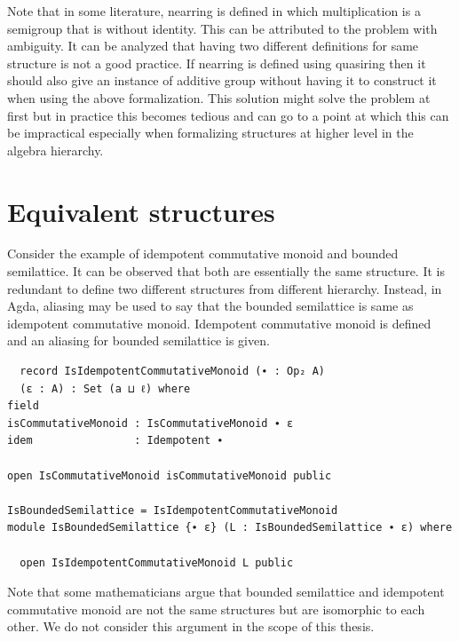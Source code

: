 Note that in some literature, nearring is defined in which multiplication is a
semigroup that is without identity. This can be attributed to the problem with
ambiguity. It can be analyzed that having two different definitions for same
structure is not a good practice. If nearring is defined using quasiring then
it should also give an instance of additive group without having it to construct
it when using the above formalization. This solution might solve the problem at
first but in practice this becomes tedious and can go to a point at which this
can be impractical especially when formalizing structures at higher level in the
algebra hierarchy.

\section{Equivalent structures}
Consider the example of idempotent commutative monoid and bounded semilattice.
It can be observed that both are essentially the same structure. It is redundant
to define two different structures from different hierarchy. Instead, in Agda,
aliasing may be used to say that the bounded semilattice is same as idempotent
commutative monoid. Idempotent commutative monoid is defined and an aliasing for
bounded semilattice is given.
\begin{verbatim}
  record IsIdempotentCommutativeMonoid (∙ : Op₂ A)
  (ε : A) : Set (a ⊔ ℓ) where
field
isCommutativeMonoid : IsCommutativeMonoid ∙ ε
idem                : Idempotent ∙

open IsCommutativeMonoid isCommutativeMonoid public

IsBoundedSemilattice = IsIdempotentCommutativeMonoid
module IsBoundedSemilattice {∙ ε} (L : IsBoundedSemilattice ∙ ε) where

  open IsIdempotentCommutativeMonoid L public
\end{verbatim}

Note that some mathematicians argue that bounded semilattice and idempotent
commutative monoid are not the same structures but are isomorphic to each other.
We do not consider this argument in the scope of this thesis.

